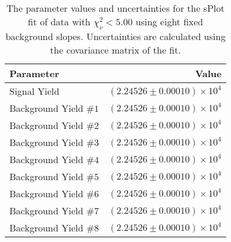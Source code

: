 
\begin{table}[h]
    \begin{center}
        \begin{tabular}{lr}\toprule
            Parameter & Value \\\midrule
            Signal Yield & $(2.24526 \pm 0.00010) \times 10^{4}$ \\
            Background Yield $\#1$ & $(2.24526 \pm 0.00010) \times 10^{4}$ \\
            Background Yield $\#2$ & $(2.24526 \pm 0.00010) \times 10^{4}$ \\
            Background Yield $\#3$ & $(2.24526 \pm 0.00010) \times 10^{4}$ \\
            Background Yield $\#4$ & $(2.24526 \pm 0.00010) \times 10^{4}$ \\
            Background Yield $\#5$ & $(2.24526 \pm 0.00010) \times 10^{4}$ \\
            Background Yield $\#6$ & $(2.24526 \pm 0.00010) \times 10^{4}$ \\
            Background Yield $\#7$ & $(2.24526 \pm 0.00010) \times 10^{4}$ \\
            Background Yield $\#8$ & $(2.24526 \pm 0.00010) \times 10^{4}$ \\\bottomrule
        \end{tabular}
        \caption{The parameter values and uncertainties for the sPlot fit of data with $\chi^2_\nu < 5.00$ using eight fixed background slopes. Uncertainties are calculated using the covariance matrix of the fit.}
    \end{center}
\end{table}
